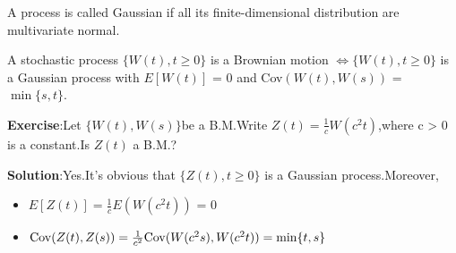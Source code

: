 \begin{Definition}
    A process is called Gaussian if all its finite-dimensional distribution
are multivariate normal.
\end{Definition}

\begin{theorem}
    A stochastic process $\{W(t),t\ge 0 \}$ is a Brownian motion $\Longleftrightarrow  \{W(t),t\ge 0 \}$ is a Gaussian process
with $E[W(t)]$ = 0 and {\rm Cov}$(W(t),W(s))$ = $\min \{s,t\}$.
\end{theorem}

{\bf Exercise}:Let $\{W(t),W(s)   \}$be a B.M.Write $Z(t) = \frac{1}{c} W(c^2t)$,where c > 0 is a constant.Is $Z(t)$ a B.M.?

{\bf Solution}:Yes.It's obvious that $\{Z(t),t\ge 0 \}$ is a Gaussian process.Moreover,
\begin{itemize}
    \item $ E[Z(t)] = \frac{1}{c} E(W(c^2 t))$ = 0
    \item $ {\rm Cov}(Z(t),Z(s)) = \frac{1}{c^2}{\rm Cov}(W(c^2s),W(c^2t)) = \min\{t,s\}$ 
\end{itemize}
